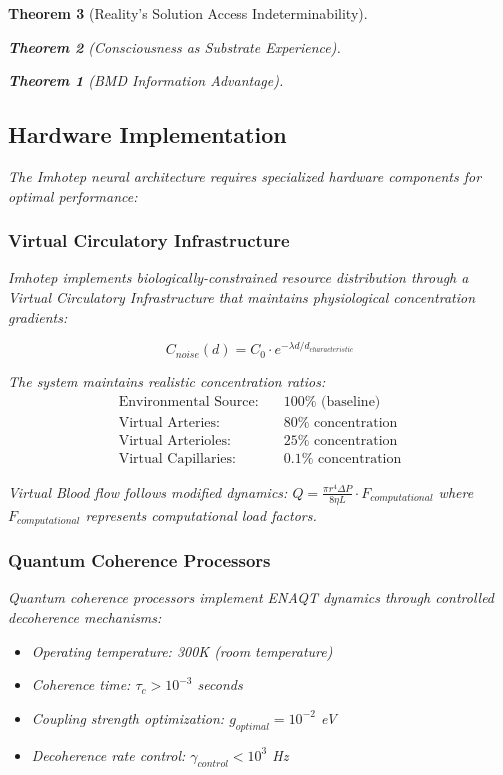 \documentclass[12pt,a4paper]{article}
\newtheorem{theorem}{Theorem}[section]
\theoremstyle{remark}
\begin{document}
\begin{theorem}[Reality's Solution Access Indeterminability]
\begin{theorem}[Consciousness as Substrate Experience]
\begin{theorem}[BMD Information Advantage]
{{{\subsection{Hardware Implementation}

The Imhotep neural architecture requires specialized hardware components for optimal performance:

\subsubsection{Virtual Circulatory Infrastructure}

Imhotep implements biologically-constrained resource distribution through a Virtual Circulatory Infrastructure that maintains physiological concentration gradients:

\begin{equation}
C_{noise}(d) = C_0 \cdot e^{-\lambda d / d_{characteristic}}
\end{equation}

The system maintains realistic concentration ratios:
\begin{align}
\text{Environmental Source:} &\quad 100\% \text{ (baseline)} \\
\text{Virtual Arteries:} &\quad 80\% \text{ concentration} \\
\text{Virtual Arterioles:} &\quad 25\% \text{ concentration} \\
\text{Virtual Capillaries:} &\quad 0.1\% \text{ concentration}
\end{align}

Virtual Blood flow follows modified dynamics: $Q = \frac{\pi r^4 \Delta P}{8 \eta L} \cdot F_{computational}$ where $F_{computational}$ represents computational load factors.

\subsubsection{Quantum Coherence Processors}

Quantum coherence processors implement ENAQT dynamics through controlled decoherence mechanisms:

\begin{itemize}
\item Operating temperature: 300K (room temperature)
\item Coherence time: $\tau_c > 10^{-3}$ seconds
\item Coupling strength optimization: $g_{optimal} = 10^{-2}$ eV
\item Decoherence rate control: $\gamma_{control} < 10^3$ Hz
\end{itemize}

}}}
\end{theorem}
\end{theorem}
\end{theorem}
\end{document}
